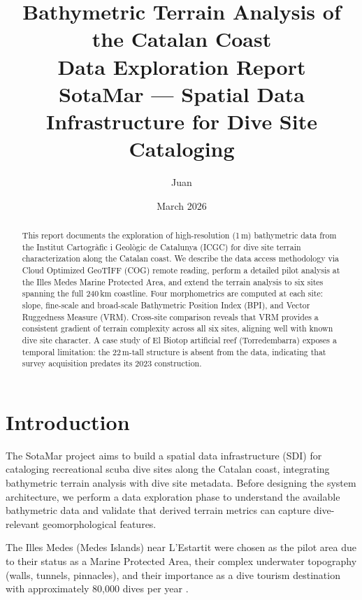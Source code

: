 \documentclass[a4paper,11pt]{article}
\title{%
    \textbf{Bathymetric Terrain Analysis of the Catalan Coast}\\[0.5em]
    \large Data Exploration Report\\
    \large SotaMar --- Spatial Data Infrastructure for Dive Site Cataloging
}
\author{Juan}
\date{March 2026}
\begin{document}
\maketitle

\begin{abstract}
This report documents the exploration of high-resolution (1\,m) bathymetric data from the
Institut Cartogr\`afic i Geol\`ogic de Catalunya (ICGC) for dive site terrain
characterization along the Catalan coast. We describe the data access methodology via Cloud
Optimized GeoTIFF (COG) remote reading, perform a detailed pilot analysis at the Illes
Medes Marine Protected Area, and extend the terrain analysis to six sites spanning the
full 240\,km coastline. Four morphometrics are computed at each site: slope, fine-scale and
broad-scale Bathymetric Position Index (BPI), and Vector Ruggedness Measure (VRM).
Cross-site comparison reveals that VRM provides a consistent gradient of terrain
complexity across all six sites, aligning well with known dive site character. A case study of El Biotop artificial reef (Torredembarra) exposes a
temporal limitation: the 22\,m-tall structure is absent from the data, indicating that
survey acquisition predates its 2023 construction.
\end{abstract}

\tableofcontents
\newpage

\section{Introduction}
\label{sec:intro}

The SotaMar project aims to build a spatial data infrastructure (SDI) for cataloging
recreational scuba dive sites along the Catalan coast, integrating bathymetric terrain
analysis with dive site metadata. Before designing the system architecture, we perform a
data exploration phase to understand the available bathymetric data and validate that
derived terrain metrics can capture dive-relevant geomorphological features.

The Illes Medes (Medes Islands) near L'Estartit were chosen as the pilot area due to their
status as a Marine Protected Area, their complex underwater topography (walls, tunnels,
pinnacles), and their importance as a dive tourism destination with approximately 80,000
dives per year \citep{lloret2008}.
\end{document}
